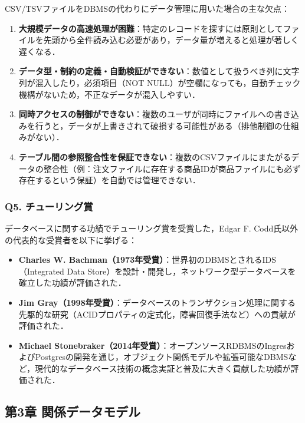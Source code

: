 CSV/TSVファイルをDBMSの代わりにデータ管理に用いた場合の主な欠点：
\begin{enumerate}
    \item \textbf{大規模データの高速処理が困難}：特定のレコードを探すには原則としてファイルを先頭から全件読み込む必要があり，データ量が増えると処理が著しく遅くなる．
    \item \textbf{データ型・制約の定義・自動検証ができない}：数値として扱うべき列に文字列が混入したり，必須項目（NOT NULL）が空欄になっても，自動チェック機構がないため，不正なデータが混入しやすい．
    \item \textbf{同時アクセスの制御ができない}：複数のユーザが同時にファイルへの書き込みを行うと，データが上書きされて破損する可能性がある（排他制御の仕組みがない）．
    \item \textbf{テーブル間の参照整合性を保証できない}：複数のCSVファイルにまたがるデータの整合性（例：注文ファイルに存在する商品IDが商品ファイルにも必ず存在するという保証）を自動では管理できない．
\end{enumerate}

\subsubsection*{Q5. チューリング賞}
データベースに関する功績でチューリング賞を受賞した，Edgar F. Codd氏以外の代表的な受賞者を以下に挙げる：
\begin{itemize}
    \item \textbf{Charles W. Bachman（1973年受賞）}：世界初のDBMSとされるIDS（Integrated Data Store）を設計・開発し，ネットワーク型データベースを確立した功績が評価された．
    \item \textbf{Jim Gray（1998年受賞）}：データベースのトランザクション処理に関する先駆的な研究（ACIDプロパティの定式化，障害回復手法など）への貢献が評価された．
    \item \textbf{Michael Stonebraker（2014年受賞）}：オープンソースRDBMSのIngresおよびPostgresの開発を通じ，オブジェクト関係モデルや拡張可能なDBMSなど，現代的なデータベース技術の概念実証と普及に大きく貢献した功績が評価された．
\end{itemize}


\subsection*{第3章 関係データモデル}

